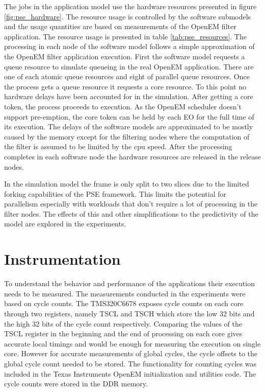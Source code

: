 The jobs in the application model use the hardware resources presented in figure
\ref{fig:pse_hardware}. The resource usage is controlled by the software
submodels and the usage quantities are based on measurements of the OpenEM
filter application. The resource usage is presented in table
\ref{tab:pse_resources}. The processing in each node of the software model
follows a simple approximation of the OpenEM filter application execution. First
the software model requests a queue resource to simulate queueing in the real
OpenEM application. There are one of each atomic queue resources and eight of
parallel queue resources. Once the process gets a queue resource it requests a
core resource. To this point no hardware delays have been accounted for in the
simulation. After getting a core token, the process proceeds to execution. As
the OpenEM scheduler doesn't support pre-emption, the core token can be held by
each EO for the full time of its execution. The delays of the software models
are approximated to be mostly caused by the memory except for the filtering
nodes where the computation of the filter is assumed to be limited by the cpu
speed. After the processing completes in each software node the hardware
resources are released in the release nodes.

In the simulation model the frame is only split to two slices due to the limited
forking capabilities of the PSE framework. This limits the potential for
parallelism especially with workloads that don't require a lot of processing in
the filter nodes. The effects of this and other simplifications to the
predictivity of the model are explored in the experiments.

\section{Instrumentation}
\label{sec:instrumentation}
To understand the behavior and performance of the applications their execution
needs to be measured. The measurements conducted in the experiments were based
on cycle counts. The TMS320C6678 exposes cycle counts on each core through two
registers, namely TSCL and TSCH which store the low 32 bits and the high 32 bits
of the cycle count respectively. Comparing the values of the TSCL register in
the beginning and the end of processing on each core gives accurate local
timings and would be enough for measuring the execution on single core. However
for accurate measurements of global cycles, the cycle offsets to the global
cycle count needed to be stored. The functionality for counting cycles was
included in the Texas Instruments OpenEM initialization and utilities code. The
cycle counts were stored in the DDR memory.

